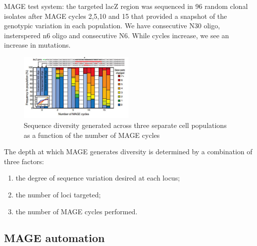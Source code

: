 MAGE test system: the targeted lacZ region was sequenced in 96 random clonal isolates after MAGE cycles 2,5,10 and 15 that provided a snapshot of the genotypic variation in each population.   
We have consecutive N30 oligo, insterspered n6 oligo and consecutive N6.  While cycles increase, we see an increase in mutations.
\begin{figure}
\includegraphics[width=0.5\textwidth, center ]{mage_test}
\caption{\label{fig:pure} Sequence diversity generated across three separate cell populations as a function of the number of MAGE cycles}
\end{figure}
\noindent
The depth at which MAGE generates diversity is determined by a combination of three factors: 
\begin{enumerate}
	\item the degree of sequence variation desired at each locus; 
	\item the number of loci targeted; 
	\item the number of MAGE cycles performed. 
\end{enumerate}
\noindent
\subsection{MAGE automation}

